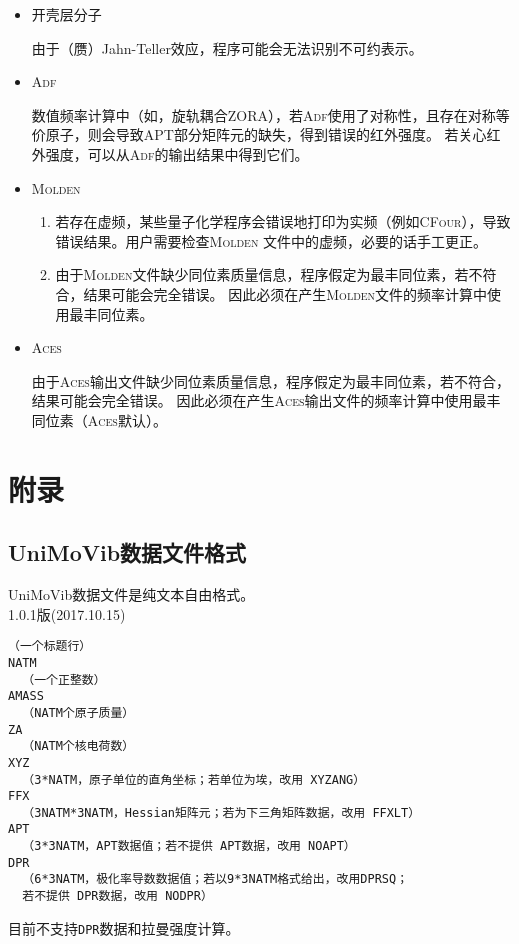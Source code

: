 \documentclass[12pt,a4paper,openany,twoside,cap]{ctexbook}
\begin{document}
\begin{itemize}
\item 开壳层分子

由于（赝）Jahn-Teller效应，程序可能会无法识别不可约表示。

\item \textsc{Adf}

数值频率计算中（如，旋轨耦合ZORA），若\textsc{Adf}使用了对称性，且存在对称等价原子，则会导致APT部分矩阵元的缺失，得到错误的红外强度。
若关心红外强度，可以从\textsc{Adf}的输出结果中得到它们。

\item \textsc{Molden}

\begin{enumerate}
\item 若存在虚频，某些量子化学程序会错误地打印为实频（例如\textsc{CFour}），导致错误结果。用户需要检查\textsc{Molden}
文件中的虚频，必要的话手工更正。

\item 由于\textsc{Molden}文件缺少同位素质量信息，程序假定为最丰同位素，若不符合，结果可能会完全错误。
因此必须在产生\textsc{Molden}文件的频率计算中使用最丰同位素。
\end{enumerate}

\item \textsc{Aces}

由于\textsc{Aces}输出文件缺少同位素质量信息，程序假定为最丰同位素，若不符合，结果可能会完全错误。
因此必须在产生\textsc{Aces}输出文件的频率计算中使用最丰同位素（\textsc{Aces}默认）。

\end{itemize}

\appendix
\chapter{附录} \label{part:appdx}

\section{UniMoVib数据文件格式} \label{sec:almfmt}

UniMoVib数据文件是纯文本自由格式。 \\
1.0.1版(2017.10.15)
\begin{colorboxed}[oval=false,boxcolor=green!75!black,bgcolor=green!5!white]
\ttfamily
\begin{lstlisting}
（一个标题行）
NATM
  （一个正整数）
AMASS
  （NATM个原子质量）
ZA
  （NATM个核电荷数）
XYZ
  （3*NATM，原子单位的直角坐标；若单位为埃，改用 XYZANG）
FFX
  （3NATM*3NATM，Hessian矩阵元；若为下三角矩阵数据，改用 FFXLT）
APT
  （3*3NATM，APT数据值；若不提供 APT数据，改用 NOAPT）
DPR
  （6*3NATM，极化率导数数据值；若以9*3NATM格式给出，改用DPRSQ；
  若不提供 DPR数据，改用 NODPR）
\end{lstlisting}\end{colorboxed}
目前不支持\verb|DPR|数据和拉曼强度计算。
\end{document}

